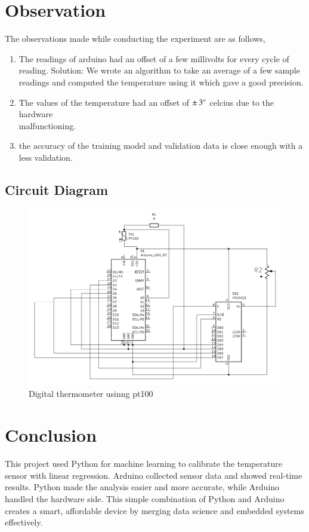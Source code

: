 \documentclass[journal,12pt,twocolumn]{IEEEtran}
\begin{document}
\section{Observation}
The observations made while conducting the experiment are as follows,
\begin{enumerate}
    \item The readings of arduino had an offset of a few millivolts for every cycle of reading.
    Solution: We wrote an algorithm to take an average of a few sample readings and computed the temperature using it which gave a good precision.
    \item The values of the temperature had an offset of $\pm \,3\degree$ celcius due to the hardware \\malfunctioning.
    \item the accuracy of the training model and validation data is close enough with a less validation.
\end{enumerate}

\begin{center}
\section{Circuit Diagram}
\begin{figure}[H]
    \centering
    \includegraphics[width=1.5\columnwidth]{figs/circuit diagram.jpeg}
    \caption{Digital thermometer usinng pt100}
    \label{fig:crtdiagram}
\end{figure}
\end{center}



\section{Conclusion}

This project used Python for machine learning to calibrate the temperature sensor with linear regression. Arduino collected sensor data and showed real-time results. Python made the analysis easier and more accurate, while Arduino handled the hardware side. This simple combination of Python and Arduino creates a smart, affordable device by merging data science and embedded systems effectively.
\end{document}
